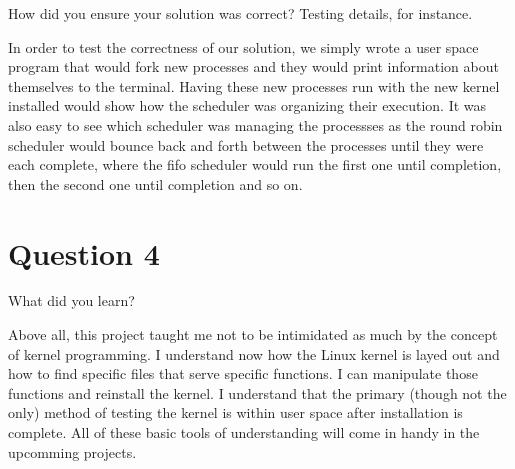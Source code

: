 \documentclass[a4paper]{article}
\begin{document}
How did you ensure your solution was correct? Testing details, for instance.

In order to test the correctness of our solution, we simply wrote a user space program that would fork new processes and they would print information about themselves to the terminal. Having these new processes run with the new kernel installed would show how the scheduler was organizing their execution. It was also easy to see which scheduler was managing the processses as the round robin scheduler would bounce back and forth between the processes until they were each complete, where the fifo scheduler would run the first one until completion, then the second one until completion and so on.

\section{Question 4}

What did you learn?

Above all, this project taught me not to be intimidated as much by the concept of kernel programming. I understand now how the Linux kernel is layed out and how to find specific files that serve specific functions. I can manipulate those functions and reinstall the kernel. I understand that the primary (though not the only) method of testing the kernel is within user space after installation is complete. All of these basic tools of understanding will come in handy in the upcomming projects.
\end{document}
